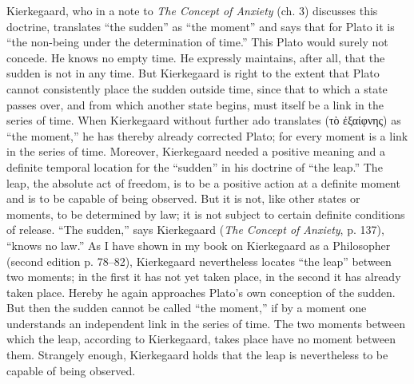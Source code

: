 \documentclass[12pt,a4paper,openany]{book}
\newcommand{\opage}[1]{\marginnote{\footnotesize\textit{[#1]}}}
\begin{document}
Kierkegaard, who in a note to \textit{The Concept of Anxiety} (ch. 3)
discusses this doctrine, translates ``the sudden'' as ``the moment''
and says that for Plato it is ``the non-being
under the determination of time.''  This Plato would surely
not concede.  He knows no empty time.  He
expressly maintains, after all, that the sudden is not in any
time.  But Kierkegaard is right to the extent that Plato
cannot consistently place the sudden outside time, since that
to which a state passes over, and from which another
\setcounter{footnote}{0}%
\opage{41}state begins, must itself be a link in the series of time.  When
Kierkegaard without further ado translates (τὸ ἐξαίφνης) as ``the moment,''
he has thereby already corrected Plato; for
every moment is a link in the series of time.  Moreover,
Kierkegaard needed a positive meaning and a definite
temporal location for the ``sudden'' in his doctrine of ``the leap.''
The leap, the absolute act of freedom, is to be a positive
action at a definite moment and is to be capable of being observed.
But it is not, like other states or moments,
to be determined by law; it is not subject to certain definite
conditions of release.  ``The sudden,'' says Kierkegaard
(\textit{The Concept of Anxiety}, p. 137), ``knows no law.''  As I have
shown in my book on Kierkegaard as a Philosopher (second
edition p. 78--82), Kierkegaard nevertheless locates ``the leap''
between two moments; in the first it has not yet
taken place, in the second it has already taken place.  Hereby he
again approaches Plato's own conception of the sudden.  But
then the sudden cannot be called ``the moment,'' if by
a moment one understands an independent link in the series of time.
The two moments between which the leap, according to Kierkegaard,
takes place have no moment between them.  Strangely
enough, Kierkegaard holds that the leap is nevertheless to be capable of being
observed.
\end{document}
